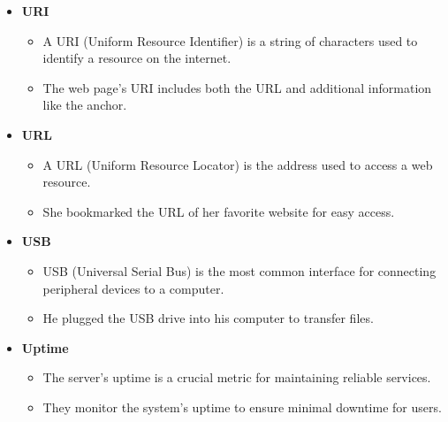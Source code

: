 \begin{itemize}
\begin{itemize}
        \end{itemize}
        \item \textbf{URI}
        \begin{itemize}
            \item A URI (Uniform Resource Identifier) is a string of characters used to identify a resource on the internet.
            \item The web page's URI includes both the URL and additional information like the anchor.
        \end{itemize}
        \item \textbf{URL}
        \begin{itemize}
            \item A URL (Uniform Resource Locator) is the address used to access a web resource.
            \item She bookmarked the URL of her favorite website for easy access.
        \end{itemize}
        \item \textbf{USB}
        \begin{itemize}
            \item USB (Universal Serial Bus) is the most common interface for connecting peripheral devices to a computer.
            \item He plugged the USB drive into his computer to transfer files.
        \end{itemize}
        \item \textbf{Uptime}
        \begin{itemize}
            \item The server's uptime is a crucial metric for maintaining reliable services.
            \item They monitor the system's uptime to ensure minimal downtime for users.
        \end{itemize}
    \end{itemize}
